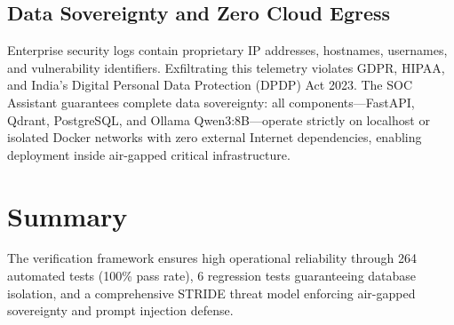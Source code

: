 \subsection{Data Sovereignty and Zero Cloud Egress}
\label{subsec:data_sovereignty}
Enterprise security logs contain proprietary IP addresses, hostnames, usernames, and vulnerability identifiers. Exfiltrating this telemetry violates GDPR, HIPAA, and India's Digital Personal Data Protection (DPDP) Act 2023. The SOC Assistant guarantees complete data sovereignty: all components---FastAPI, Qdrant, PostgreSQL, and Ollama Qwen3:8B---operate strictly on localhost or isolated Docker networks with zero external Internet dependencies, enabling deployment inside air-gapped critical infrastructure.

\section{Summary}
\label{sec:ch8_summary}
The verification framework ensures high operational reliability through 264 automated tests (100\% pass rate), 6 regression tests guaranteeing database isolation, and a comprehensive STRIDE threat model enforcing air-gapped sovereignty and prompt injection defense.